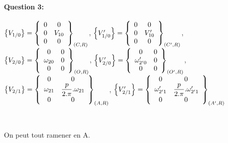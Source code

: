 \paragraph{Question 3:} 
$\left\{V_{1/0}\right\}=\left\{\begin{array}{c c} 0 & 0 \\ 0 & V_{10} \\ 0 & 0
\end{array}\right\}_{(C,R)}$,
$\left\{V'_{1/0}\right\}=\left\{\begin{array}{c c} 0 & 0 \\ 0 & V'_{10} \\ 0 & 0
\end{array}\right\}_{(C',R)}$,
$\left\{V_{2/0}\right\}=\left\{\begin{array}{c c} 0 & 0 \\ \omega_{20} & 0 \\ 0 & 0
\end{array}\right\}_{(O,R)}$,
$\left\{V'_{2/0}\right\}=\left\{\begin{array}{c c} 0 & 0 \\ \omega'_{2'0} & 0 \\ 0 & 0
\end{array}\right\}_{(O',R)}$,
$\left\{V_{2/1}\right\}=\left\{\begin{array}{c c} 0 & 0 \\ \omega_{21} & \dfrac{p}{2.\pi}.\omega_{21} \\ 0 & 0
\end{array}\right\}_{(A,R)}$,
$\left\{V'_{2/1}\right\}=\left\{\begin{array}{c c} 0 & 0 \\ \omega'_{2'1} & \dfrac{p}{2.\pi}.\omega'_{2'1} \\ 0 & 0
\end{array}\right\}_{(A',R)}$

~\

On peut tout ramener en A.

